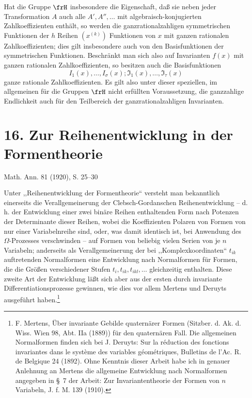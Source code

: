 \documentclass[11pt]{article}
\begin{document}
Hat die Gruppe \(\frH\) insbesondere die Eigenschaft, daß sie neben jeder Transformation \(A\) auch alle \(A',A'',\ldots\) mit algebraisch-konjugierten Zahlkoeffizienten enthält, so werden die ganzrationalzahligen symmetrischen Funktionen der \(h\) Reihen \((x^{(k)})\) Funktionen von \(x\) mit ganzen rationalen Zahlkoeffizienten; dies gilt insbesondere auch von den Basisfunktionen der symmetrischen Funktionen. Beschränkt man sich also auf Invarianten \(f(x)\) mit ganzen rationalen Zahlkoeffizienten, so besitzen auch die Basisfunktionen
\[
        I_1(x),\ldots,I_\sigma(x);\mathfrak I_1(x),\ldots,\mathfrak I_\tau(x)
\]
ganze rationale Zahlkoeffizienten. Es gilt also unter dieser speziellen, im allgemeinen für die Gruppen \(\frH\) nicht erfüllten Voraussetzung, die ganzzahlige Endlichkeit auch für den Teilbereich der ganzrationalzahligen Invarianten.




\section*{16. Zur Reihenentwicklung in der Formentheorie}
\begin{center}
Math. Ann. 81 (1920), S. 25--30
\end{center}

Unter ,,Reihenentwicklung der Formentheorie`` versteht man bekanntlich einerseits die Verallgemeinerung der Clebsch-Gordanschen Reihenentwicklung -- d. h. der Entwicklung einer zwei binäre Reihen enthaltenden Form nach Potenzen der Determinante dieser Reihen, wobei die Koeffizienten Polaren von Formen von nur einer Variabelnreihe sind, oder, was damit identisch ist, bei Anwendung des $\Omega$-Prozesses verschwinden -- auf Formen von beliebig vielen Serien von je $n$ Variabeln; anderseits als Verallgemeinerung der bei ,,Komplexkoordinaten`` $t_{ik}$ auftretenden Normalformen eine Entwicklung nach Normalformen für Formen, die die Größen verschiedener Stufen $t_i,t_{ik},t_{ikl},\ldots$ gleichzeitig enthalten. Diese zweite Art der Entwicklung läßt sich aber aus der ersten durch invariante Differentiationsprozesse gewinnen, wie dies vor allem Mertens und Deruyts ausgeführt haben.\footnote{F. Mertens, Über invariante Gebilde quaternärer Formen (Sitzber. d. Ak. d. Wiss. Wien 98, Abt. IIa (1889)) für den quaternären Fall. Die allgemeinen Normalformen finden sich bei J. Deruyts: Sur la réduction des fonctions invariantes dans le système des variables géométriques, Bulletins de l'Ac. R. de Belgique 24 (1892). Ohne Kenntnis dieser Arbeit habe ich in genauer Anlehnung an Mertens die allgemeine Entwicklung nach Normalformen angegeben in \S~7 der Arbeit: Zur Invariantentheorie der Formen von $n$ Variabeln, J. f. M. 139 (1910).}
\end{document}
